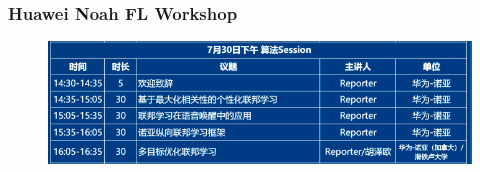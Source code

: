 




\begin{frame}
\frametitle{Huawei Noah FL Workshop}

\begin{figure}
    \centering
    \includegraphics[keepaspectratio,width=\textwidth]{images/huawei_noah_fl_workshop.png}
\end{figure}

\end{frame}


